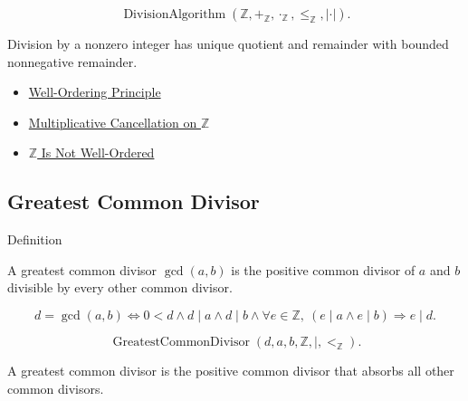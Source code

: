 \begin{remark*}
\[
\operatorname{DivisionAlgorithm}(\mathbb{Z},+_{\mathbb{Z}},\cdot_{\mathbb{Z}},\le_{\mathbb{Z}},|\cdot|).
\]
\end{remark*}

\begin{remark*}[Interpretation]
Division by a nonzero integer has unique quotient and remainder with bounded
nonnegative remainder.
\end{remark*}

\begin{dependencies}
\begin{itemize}
  \item \hyperref[thm:well-ordering-principle]{Well-Ordering Principle}
  \item \hyperref[cor:multiplicative-cancellation-on-z]{Multiplicative Cancellation on $\mathbb{Z}$}
  \item \hyperref[thm:z-is-not-well-ordered]{$\mathbb{Z}$ Is Not Well-Ordered}
\end{itemize}
\end{dependencies}

\subsection*{Greatest Common Divisor}

\begin{definitionbox}{Definition}
\begin{definition}
\label{def:greatest-common-divisor-in-z}
A greatest common divisor $\gcd(a,b)$ is the positive common divisor of
$a$ and $b$ divisible by every other common divisor.
\end{definition}
\end{definitionbox}

\begin{remark*}
\[
d=\gcd(a,b)
\Longleftrightarrow
0<d\land d\mid a\land d\mid b
\land
\forall e\in\mathbb{Z},\ (e\mid a\land e\mid b)\Longrightarrow e\mid d.
\]
\end{remark*}

\begin{remark*}
\[
\operatorname{GreatestCommonDivisor}(d,a,b,\mathbb{Z},\mid,<_{\mathbb{Z}}).
\]
\end{remark*}

\begin{remark*}[Interpretation]
A greatest common divisor is the positive common divisor that absorbs all
other common divisors.
\end{remark*}

